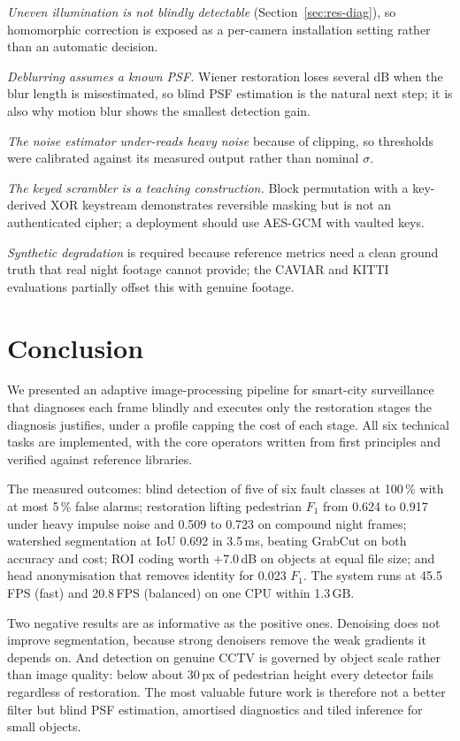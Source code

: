 \documentclass[conference,10pt]{IEEEtran}
\begin{document}
\textit{Uneven illumination is not blindly detectable}
(Section~\ref{sec:res-diag}), so homomorphic correction is exposed as a
per-camera installation setting rather than an automatic decision.

\textit{Deblurring assumes a known PSF.} Wiener restoration loses several dB
when the blur length is misestimated, so blind PSF estimation is the natural
next step; it is also why motion blur shows the smallest detection gain.

\textit{The noise estimator under-reads heavy noise} because of clipping, so
thresholds were calibrated against its measured output rather than nominal
$\sigma$.

\textit{The keyed scrambler is a teaching construction.} Block permutation with
a key-derived XOR keystream demonstrates reversible masking but is not an
authenticated cipher; a deployment should use AES-GCM with vaulted keys.

\textit{Synthetic degradation} is required because reference metrics need a
clean ground truth that real night footage cannot provide; the CAVIAR and
KITTI evaluations partially offset this with genuine footage.

\section{Conclusion}\label{sec:conclusion}
We presented an adaptive image-processing pipeline for smart-city surveillance
that diagnoses each frame blindly and executes only the restoration stages the
diagnosis justifies, under a profile capping the cost of each stage. All six
technical tasks are implemented, with the core operators written from first
principles and verified against reference libraries.

The measured outcomes: blind detection of five of six fault classes at 100\,\%
with at most 5\,\% false alarms; restoration lifting pedestrian $F_1$ from
0.624 to 0.917 under heavy impulse noise and 0.509 to 0.723 on compound night
frames; watershed segmentation at IoU 0.692 in 3.5\,ms, beating GrabCut on both
accuracy and cost; ROI coding worth $+7.0$\,dB on objects at equal file size;
and head anonymisation that removes identity for 0.023 $F_1$. The system runs
at 45.5\,FPS (\textsf{fast}) and 20.8\,FPS (\textsf{balanced}) on one CPU
within 1.3\,GB.

Two negative results are as informative as the positive ones. Denoising does
not improve segmentation, because strong denoisers remove the weak gradients it
depends on. And detection on genuine CCTV is governed by object scale rather
than image quality: below about 30\,px of pedestrian height every detector
fails regardless of restoration. The most valuable future work is therefore not
a better filter but blind PSF estimation, amortised diagnostics and tiled
inference for small objects.

\balance
\let\oldthebibliography\thebibliography
\renewcommand{\thebibliography}[1]{\oldthebibliography{#1}\scriptsize
  \setlength{\itemsep}{0pt plus 0.2pt}}


\end{document}
